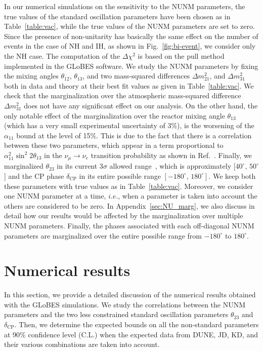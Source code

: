 \documentclass[11pt,a4paper]{article}
\newcommand{\ie}{\textit{i.e.}}
\begin{document}
In our numerical simulations on the sensitivity to the NUNM parameters, the true values of the standard oscillation parameters have been chosen as in Table~\ref{table:vac}, while the true values of the NUNM parameters are set to zero. Since the presence of non-unitarity has basically the same effect on the number of events in the case of NH and IH, as shown in Fig.~\ref{fig:bi-event}, we consider only the NH case. The computation of the $\Delta\chi^2$
is based on the pull method~\cite{Huber:2002mx,Fogli:2002pt,Gonzalez-Garcia:2004pka} implemented in the GLoBES software.
We study the NUNM parameters by fixing the mixing angles $\theta_{12}$, $\theta_{13}$, and two mass-squared differences $\Delta m^2_{21}$, and $\Delta m^2_{31}$ both in data and theory at their best fit values as given in Table~\ref{table:vac}. 
We check that the marginalization over the atmospheric mass-squared difference $\Delta m^2_{31}$ does not have any significant effect on our analysis. On the other hand, the only notable effect of the marginalization over the reactor mixing angle $\theta_{13}$ (which has a very small experimental uncertainty of 3\%), is the worsening of the $\alpha_{11}$ bound at the level of 15\%. This is due to the fact that there is a correlation between these two parameters, which appear in a term proportional to $\alpha_{11}^2\sin^2 2\theta_{13}$ in the $\nu_\mu\to\nu_e$ transition probability as shown in Ref.~\cite{Escrihuela:2015wra}. 
Finally, we marginalized $\theta_{23}$ in its current 3$\sigma$ allowed range~\cite{Capozzi:2021fjo}, which is approximately [$40^{\circ},\, 50^{\circ}$] and the CP phase $\delta_{\mathrm{CP}}$ in its entire possible range $[-180^{\circ},\, 180^{\circ}]$. We keep both these parameters with true values as in Table~\ref{table:vac}. Moreover, we consider one NUNM parameter at a time, $\ie$,  when a parameter is taken into account the others are considered to be zero. In Appendix~\ref{sec:NU_marg}, we also discuss in detail how our results would be affected by the marginalization over multiple NUNM parameters. Finally, the phases associated with each off-diagonal NUNM parameters are marginalized over the entire possible range from $-180^{\circ}$ to $180^{\circ}$.

\section{Numerical results}
\label{results}

In this section, we provide a detailed discussion of the numerical results obtained with the GLoBES simulations. We study the correlations between the NUNM parameters and the two less constrained standard oscillation parameters $\theta_{23}$ and $\delta_{\mathrm{CP}}$. Then, we determine the expected bounds on all the non-standard parameters at 90\% confidence level (C.L.) when the expected data from DUNE, JD, KD, and their various combinations are taken into account.
\end{document}
